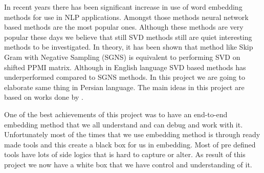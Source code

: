 %
In recent years there has been significant increase in use of word embedding methods for use in NLP applications. Amongst those methods neural network based methods are the most popular ones. Although these methods are very popular these days we believe that still SVD methods still are quiet interesting methods to be investigated.  In theory, it has been shown that method like Skip Gram with Negative Sampling (SGNS) is equivalent to performing SVD on shifted PPMI matrix. Although in English language SVD based methods has underperformed compared to SGNS methods. In this project we are going to elaborate same thing in Persian language. The main ideas in this project are based on works done by \cite{DBLP:conf/conll/2014} \cite{DBLP:journals/tacl/LevyGD15} \cite{NIPS2014_5477}. 

One of the best achievements of this project was to have an end-to-end embedding method that we all understand and can debug and work with it. Unfortunately most of the times that we use embedding method is through ready made tools and this create a black box for us in embedding. Most of pre defined tools have lots of side logics that is hard to capture  or alter. As result of this project we now have a white box that we have control and understanding of it.  

